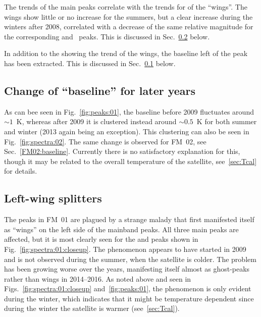 The trends of the main peaks correlate with the trends for of the ``wings''.
The wings show little or no increase for the summers, but a clear increase
during the winters after 2008, correlated with a decrease of the same relative
magnitude for the corresponding  and ~peaks.  This is
discussed in Sec.~\ref{FM01:leftwings} below.

In addition to the showing the trend of the wings, the baseline left of the
 peak has been extracted.  This is discussed in
Sec.~\ref{FM01:baseline} below.


\subsection{Change of ``baseline'' for later years}
\label{FM01:baseline}
As can bee seen in Fig.~\ref{fig:peaks:01}, the baseline before 2009 fluctuates
around $\sim1$~K, whereas after 2009 it is clustered instead around $\sim0.5$~K
for both summer and winter (2013 again being an exception).  This clustering
can also be seen in Fig.~\ref{fig:spectra:02}.  The same change is observed for
FM~02, see Sec.~\ref{FM02:baseline}.  Currently there is no satisfactory
explanation for this, though it may be related to the overall temperature of
the satellite, see~\ref{sec:Tcal} for details.


\subsection{Left-wing splitters}
\label{FM01:leftwings}
The peaks in FM~01 are plagued by a strange malady that first manifested itself
as ``wings'' on the left side of the mainband peaks.  All three main peaks are
affected, but it is most clearly seen for the  and  peaks
shown in Fig.~\ref{fig:spectra:01:closeup}.  The phenomenon appears to have
started in 2009 and is not observed during the summer, when the satellite is
colder.  The problem has been growing worse over the years, manifesting itself
almost as ghost-peaks rather than wings in 2014--2016.  As noted above and seen
in Figs.~\ref{fig:spectra:01:closeup} and~\ref{fig:peaks:01}, the phenomenon is
only evident during the winter, which indicates that it might be temperature
dependent since during the winter the satellite is warmer (see~\ref{sec:Tcal}).


